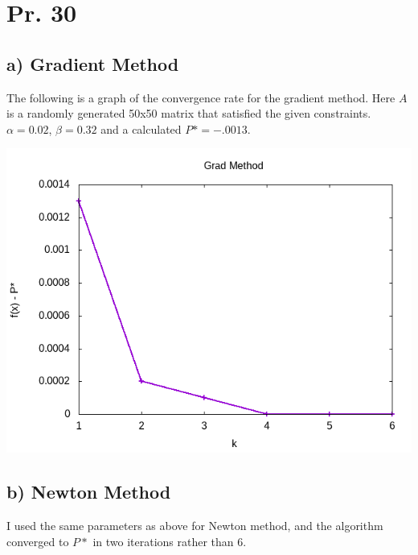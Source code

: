 \documentclass[11pt]{article}
\date{\today}
\title{}
\begin{document}
\section{Pr. 30}
\label{sec:org2eeb131}
\subsection{a) Gradient Method}
\label{sec:org73dce56}
The following is a graph of the convergence rate for the gradient method. Here  \(A\) is a randomly generated 50x50 matrix that satisfied the given constraints. \(\alpha = 0.02\), \(\beta = 0.32\) and a calculated \(P* = -.0013\). 


\begin{center}
\includegraphics[width=.9\linewidth]{grad.png}
\end{center}

\subsection{b) Newton Method}
\label{sec:org05ed1f5}
I used the same parameters as above for Newton method, and the algorithm converged to \(P*\) in two iterations rather than 6.
\end{document}
